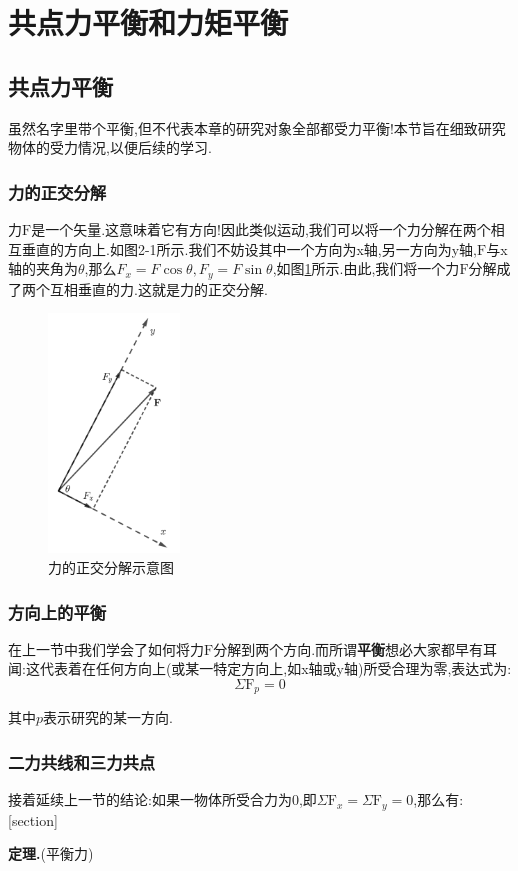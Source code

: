  
\section{共点力平衡和力矩平衡} 
\subsection{共点力平衡}
虽然名字里带个平衡,但不代表本章的研究对象全部都受力平衡!本节旨在细致研究物体的受力情况,以便后续的学习.
\subsubsection{力的正交分解}
力$\boldsymbol{\mathrm{F}}$是一个矢量.这意味着它有方向!因此类似运动,我们可以将一个力分解在两个相互垂直的方向上.如图2-1所示.我们不妨设其中一个方向为x轴,另一方向为y轴,$\boldsymbol{\mathrm{F}}$与x轴的夹角为$\theta$,那么$F_x=F\cos\theta,F_y=F\sin\theta$,如图\ref{Fzjfj}所示.由此,我们将一个力$\boldsymbol{\mathrm{F}}$分解成了两个互相垂直的力.这就是力的正交分解.\begin{figure}[htp]\centering\includegraphics[width=3.5cm]{6-2}\caption[力的正交分解]{力的正交分解示意图}\label{Fzjfj} \end{figure}
\subsubsection{方向上的平衡}
在上一节中我们学会了如何将力$\boldsymbol{\mathrm{F}}$分解到两个方向.而所谓\textbf{平衡}想必大家都早有耳闻:这代表着在任何方向上(或某一特定方向上,如x轴或y轴)所受合理为零,表达式为:\begin{equation}
	\Sigma \boldsymbol{\mathrm{F}}_p=0
\end{equation}


其中$p$表示研究的某一方向.
\subsubsection{二力共线和三力共点}
接着延续上一节的结论:如果一物体所受合力为0,即$\Sigma  \boldsymbol{\mathrm{F}}_x=\Sigma \boldsymbol{\mathrm{F}}_y=0$,那么有: 
[section]    %
\renewcommand{\theDL}{\thesection.\arabic{DL}}  %
\newcommand{\theorem}[1][]{\par\textbf{定理}\textbf{\theDL}(#1)\quad}  %
\theorem[平衡力]\label{dl1.1}


